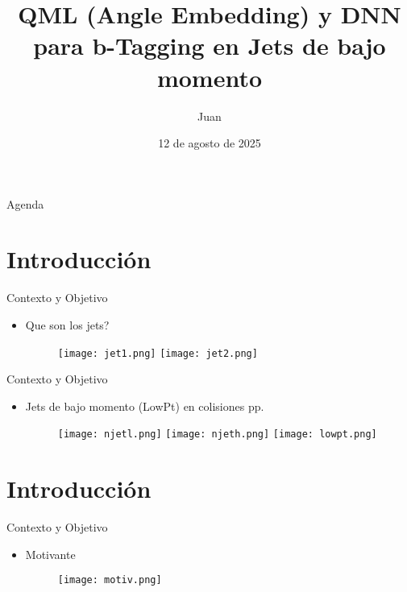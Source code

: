 \documentclass{beamer}
\title{QML (Angle Embedding) y DNN para b-Tagging en Jets de bajo momento}
\author{Juan}
\institute{Instituto de Física}
\date{12 de agosto de 2025}
\begin{document}
\begin{frame}
  \titlepage
\end{frame}

\begin{frame}{Agenda}
  \tableofcontents
\end{frame}

\section{Introducción}
\begin{frame}{Contexto y Objetivo}
  \begin{itemize}
    \item Que son los jets?
    \begin{figure}
      \centering
      \texttt{[image: jet1.png]}
      \hfill
      \texttt{[image: jet2.png]}
    \end{figure}
  \end{itemize}
\end{frame}

\begin{frame}{Contexto y Objetivo}
  \begin{itemize}
    \item Jets de bajo momento (LowPt) en colisiones pp.
    \begin{figure}
      \centering
      \texttt{[image: njetl.png]}
      \hfill
      \texttt{[image: njeth.png]}
      \hfill
      \texttt{[image: lowpt.png]}
    \end{figure}
  \end{itemize}
\end{frame}

\section{Introducción}
\begin{frame}{Contexto y Objetivo}
  \begin{itemize}
    \item Motivante
    \begin{figure}
      \centering
      \texttt{[image: motiv.png]}
    \end{figure}
  \end{itemize}
\end{frame}
\end{document}
